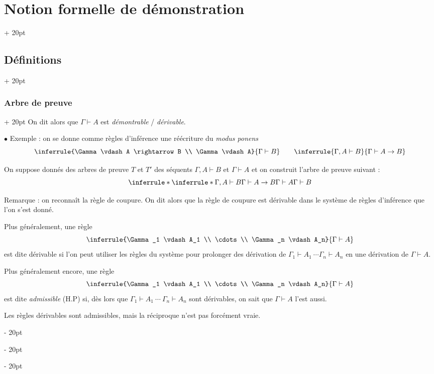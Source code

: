 \documentclass[a4paper, 12pt, twoside]{article}
\newcommand{\ind}[1][20pt]{\advance\leftskip + #1}
\newcommand{\deind}[1][20pt]{\advance\leftskip - #1}
\newenvironment{indt}[2][20pt]{#2 \par \ind[#1]}{\par \deind} %
\begin{document}
\begin{indt}{\section{Notion formelle de démonstration}}
\begin{indt}{\subsection{Définitions}}
\begin{indt}{\subsubsection{Arbre de preuve}}
                On dit alors que $\Gamma \vdash A$ est \emph{démontrable} / \emph{dérivable}.

                \vspace{12pt}
                
                $\bullet$ Exemple : on se donne comme règles d'inférence une réécriture du \textit{modus ponens}
                \[
                    \inferrule{\Gamma \vdash A \rightarrow B \\ \Gamma \vdash A}{\Gamma \vdash B}
                    \qquad
                    \inferrule{\Gamma, A \vdash B}{\Gamma \vdash A \rightarrow B}
                \]

                On suppose donnés des arbres de preuve $T$ et $T'$ des séquents $\Gamma, A \vdash B$ et $\Gamma \vdash A$ et on construit l'arbre de preuve suivant :
                \[
                    \inferrule*
                    {
                        \inferrule*{\Gamma, A \vdash B}{\Gamma \vdash A \rightarrow B}
                        \\
                        \Gamma \vdash A
                    }
                    {\Gamma \vdash B}
                \]

                \vspace{6pt}
                
                Remarque : on reconnaît la règle de coupure. On dit alors que la règle de coupure est dérivable dans le système de règles d'inférence que l'on s'est donné.

                Plus généralement, une règle
                \[
                    \inferrule{\Gamma_1 \vdash A_1 \\ \cdots \\ \Gamma_n \vdash A_n}{\Gamma \vdash A}
                \]
                est dite dérivable si l'on peut utiliser les règles du système pour prolonger des dérivation de $\Gamma_1 \vdash A_1\ \cdots \Gamma_n \vdash A_n$ en une dérivation de $\Gamma \vdash A$.

                Plus généralement encore, une règle
                \[
                    \inferrule{\Gamma_1 \vdash A_1 \\ \cdots \\ \Gamma_n \vdash A_n}{\Gamma \vdash A}
                \]
                est dite \emph{admissible} (H.P) si, dès lors que $\Gamma_1 \vdash A_1\ \cdots\ \Gamma_n \vdash A_n$ sont dérivables, on sait que $\Gamma \vdash A$ l'est aussi.

                Les règles dérivables sont admissibles, mais la réciproque n'est pas forcément vraie.


\end{indt}
\end{indt}
\end{indt}
\end{document}
